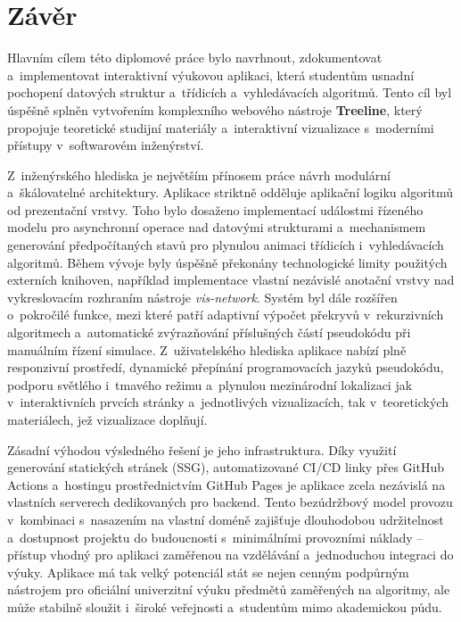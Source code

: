 \chapter{Závěr}
\label{chap:conclusion}

Hlavním cílem této diplomové práce bylo navrhnout, zdokumentovat a~implementovat interaktivní výukovou aplikaci, která studentům usnadní pochopení datových struktur a~třídicích a~vyhledávacích algoritmů.
Tento cíl byl úspěšně splněn vytvořením komplexního webového nástroje \textbf{Treeline}, který propojuje teoretické studijní materiály a~interaktivní vizualizace s~moderními přístupy v~softwarovém inženýrství.

Z~inženýrského hlediska je největším přínosem práce návrh modulární a~škálovatelné architektury.
Aplikace striktně odděluje aplikační logiku algoritmů od prezentační vrstvy.
Toho bylo dosaženo implementací událostmi řízeného modelu pro asynchronní operace nad datovými strukturami a~mechanismem generování předpočítaných stavů pro plynulou animaci třídicích i~vyhledávacích algoritmů.
Během vývoje byly úspěšně překonány technologické limity použitých externích knihoven, například implementace vlastní nezávislé anotační vrstvy nad vykreslovacím rozhraním nástroje \textit{vis-network}.
Systém byl dále rozšířen o~pokročilé funkce, mezi které patří adaptivní výpočet překryvů v~rekurzivních algoritmech a~automatické zvýrazňování příslušných částí pseudokódu při manuálním řízení simulace.
Z~uživatelského hlediska aplikace nabízí plně responzivní prostředí, dynamické přepínání programovacích jazyků pseudokódu, podporu světlého i~tmavého režimu a~plynulou mezinárodní lokalizaci jak v~interaktivních prvcích stránky a~jednotlivých vizualizacích, tak v~teoretických materiálech, jež vizualizace doplňují.

Zásadní výhodou výsledného řešení je jeho infrastruktura.
Díky využití generování statických stránek (SSG), automatizované CI/CD linky přes \mbox{GitHub} Actions a~hostingu prostřednictvím \mbox{GitHub} Pages je aplikace zcela nezávislá na vlastních serverech dedikovaných pro backend.
Tento bezúdržbový model provozu v~kombinaci s~nasazením na vlastní doméně zajišťuje dlouhodobou udržitelnost a~dostupnost projektu do budoucnosti s~minimálními provozními náklady -- přístup vhodný pro aplikaci zaměřenou na vzdělávání a~jednoduchou integraci do výuky.
Aplikace má tak velký potenciál stát se nejen cenným podpůrným nástrojem pro oficiální univerzitní výuku předmětů zaměřených na algoritmy, ale může stabilně sloužit i~široké veřejnosti a~studentům mimo akademickou půdu.


